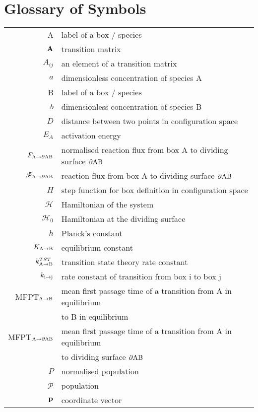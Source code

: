 \chapter*{Glossary of Symbols}

\begin{longtable}{r >{\rule{0pt}{3ex}}l<{\rule[-1.5ex]{0pt}{0pt}}}
A & label of a box / species \\
${\bf A}$ & transition matrix \\
$A_{ij}$ & an element of a transition matrix \\
$a$ & dimensionless concentration of species A \\
B & label of a box / species \\
$b$ & dimensionless concentration of species B \\
$D$ & distance between two points in configuration space \\
$E_A$ & activation energy \\
$F_{\rm A \rightarrow \partial AB}$ & normalised reaction flux from box A to dividing surface ${\rm \partial AB}$ \\
$\mathscr{F}_{\rm A \rightarrow \partial AB}$ & reaction flux from box A to dividing surface ${\rm \partial AB}$ \\
$H$ & step function for box definition in configuration space \\
$\mathscr{H}$ & Hamiltonian of the system \\
$\mathscr{H}_0$ & Hamiltonian at the dividing surface \\
$h$ & Planck's constant \\
$K_{\rm A \rightarrow B}$ & equilibrium constant \\
$k_{\rm A \rightarrow B}^{TST}$ & transition state theory rate constant \\
$k_{\rm i \rightarrow j}$ & rate constant of transition from box i to box j \\
MFPT$_{\rm A \rightarrow B}$ & mean first passage time of a transition from A in equilibrium \\
&to B in equilibrium \\
MFPT$_{\rm A \rightarrow \partial AB}$ & mean first passage time of a transition from A in equilibrium \\
& to dividing surface ${\rm \partial AB}$ \\
$P$ & normalised population \\ %
$\mathscr{P}$ & population \\
$\bf p$\rm & coordinate vector \\

\end{longtable}
